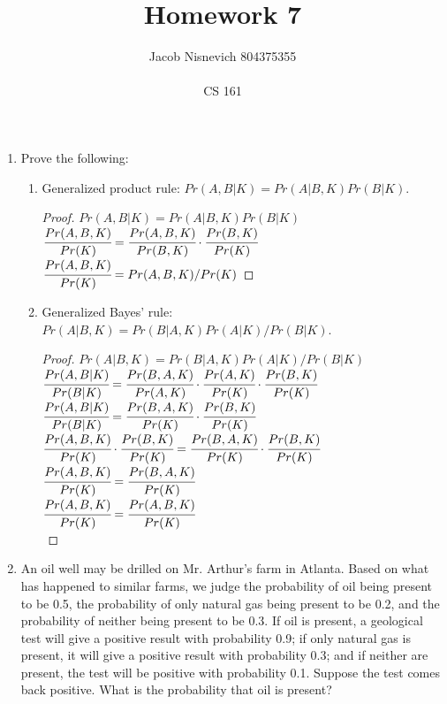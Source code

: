 \documentclass[12pt]{article}
\begin{document}
 
\title{Homework 7}
\author{Jacob Nisnevich \textemdash \hspace{2px} 804375355 \\ \\
CS 161}
 
\maketitle
 
\begin{enumerate}
	\item Prove the following:

	\begin{enumerate}
		\item Generalized product rule: $Pr(A, B | K) = Pr(A | B, K) Pr(B | K)$.

		\begin{proof}
		$Pr(A, B | K) = Pr(A | B, K) Pr(B | K)$ \\
		$\cfrac{Pr(A, B, K)}{Pr(K)} = \cfrac{Pr(A, B, K)}{Pr(B, K)} \cdot \cfrac{Pr(B, K)}{Pr(K)}$ \\
		$\cfrac{Pr(A, B, K)}{Pr(K)} = Pr(A, B, K) / Pr(K)$
		\end{proof}

		\item Generalized Bayes’ rule: $Pr(A | B, K) = Pr(B | A, K)Pr(A | K)/Pr(B | K)$.

		\begin{proof}
		$Pr(A | B, K) = Pr(B | A, K)Pr(A | K)/Pr(B | K)$ \\
		$\cfrac{Pr(A,B|K)}{Pr(B|K)} = \cfrac{Pr(B,A,K)}{Pr(A,K)} \cdot \cfrac{Pr(A,K)}{Pr(K)} \cdot \cfrac{Pr(B,K)}{Pr(K)}$ \\
		$\cfrac{Pr(A,B|K)}{Pr(B|K)} = \cfrac{Pr(B,A,K)}{Pr(K)} \cdot \cfrac{Pr(B,K)}{Pr(K)}$ \\
		$\cfrac{Pr(A,B,K)}{Pr(K)} \cdot \cfrac{Pr(B,K)}{Pr(K)} = \cfrac{Pr(B,A,K)}{Pr(K)} \cdot \cfrac{Pr(B,K)}{Pr(K)}$ \\
		$\cfrac{Pr(A,B,K)}{Pr(K)} = \cfrac{Pr(B,A,K)}{Pr(K)}$ \\
		$\cfrac{Pr(A,B,K)}{Pr(K)} = \cfrac{Pr(A,B,K)}{Pr(K)}$ \\
		\end{proof}

	\end{enumerate}

	\item An oil well may be drilled on Mr. Arthur’s farm in Atlanta. Based on what has happened to similar farms, we judge the probability of oil being present to be 0.5, the probability of only natural gas being present to be 0.2, and the probability of neither being present to be 0.3. If oil is present, a geological test will give a positive result with probability 0.9; if only natural gas is present, it will give a positive result with probability 0.3; and if neither are present, the test will be positive with probability 0.1. Suppose the test comes back positive. What is the probability that oil is present?\\


\end{enumerate}
\end{document}

